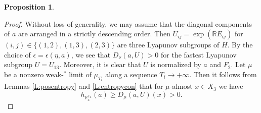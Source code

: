 \documentclass[reqno,12pt]{amsart}
\newtheorem{proposition}[theorem]{Proposition}
\theoremstyle{definition}
\numberwithin{equation}{section}
\newcommand{\RR}{\mathbb{R}}
\newcommand{\E}{\mathscr{E}}
\newcommand {\comm}[1]   {\textcolor{red}{#1}}
\newcommand {\neww}[1]   {\textcolor{purple}{#1}}
\begin{document}
{\begin{proposition}
\end{proposition}
\begin{proof}
    Without loss of generality, we may assume that %
    the diagonal components of $a$ are arranged in a strictly descending order. Then $U_{ij}=\exp(\RR E_{ij})$ for $(i,j)\in \{(1,2),(1,3),(2,3)\}$ are three Lyapunov subgroups of $H$. By the choice of $\epsilon=\epsilon(\eta,a)$, we see that $D_{\nu}(a,U)>0$ for the fastest Lyapunov subgroup $U=U_{13}$. 
    Moreover, it is clear that $U$ is normalized by $a$ and $F_2$. Let $\mu$ be a nonzero weak-${}^*$ limit of $\mu_{T_i}$ along a sequence $T_i\to +\infty$. %
   Then it follows from %
    Lemmas \ref{L:posentropy} and \ref{L:entropycon} that for $\mu$-almost $x\in X_3$ we have $$h_{\mu^{\E_a}_x}(a)\geq D_{\mu}(a,U)(x)>0.$$ %
    

\end{proof}}
\end{document}
